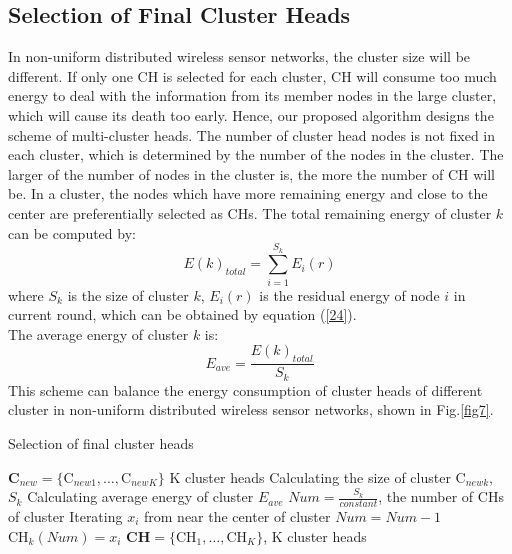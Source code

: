 \documentclass[journal,twoside,web]{ieeecolor}
\begin{document}
\subsection{Selection of Final Cluster Heads}
In non-uniform distributed wireless sensor networks, the cluster size will be different. If only one CH is selected for each cluster, CH will consume too much energy to deal with the information from its member nodes in the large cluster, which will cause its death too early. Hence, our proposed algorithm designs the scheme of multi-cluster heads. The number of cluster head nodes is not fixed in each cluster, which is determined by the number of the nodes in the cluster. The larger of the number of nodes in the cluster is, the more the number of CH will be. In a cluster, the nodes which have more remaining energy and close to the center are preferentially selected as CHs. The total remaining energy of cluster $k$ can be computed by:
\begin{equation}
E\left(k\right)_{total} = \sum_{i=1}^{S_k}E_i\left(r\right)
\end{equation}
where $S_k$ is the size of cluster $k$, $E_i\left(r\right)$ is the residual energy of node $i$ in current round, which can be obtained by equation (\ref{24}).\\
The average energy of cluster $k$ is:
\begin{equation}
E_{ave} = \frac{E\left(k\right)_{total}}{S_k}
\end{equation}
\noindent This scheme can balance the energy consumption of cluster heads of different cluster in non-uniform distributed wireless sensor networks, shown in Fig.\ref{fig7}.

\begin{algorithm}
	\caption{Selection of final cluster heads}
	\label{alg3} 
	\begin{algorithmic}[1]
		\renewcommand{\algorithmicrequire}{\textbf{Input:}}
		\renewcommand{\algorithmicensure}{\textbf{Output:}}
		\REQUIRE $\bm{C}_{new}=\{\text{C}_{new1},\dots,\text{C}_{newK}\}$
		\ENSURE K cluster heads
			\STATE Calculating the size of cluster $\text{C}_{newk}$, $S_k$
			\STATE Calculating average energy of cluster $E_{ave}$
			\STATE $Num = \frac{S_k}{constant}$, the number of CHs of cluster
				\STATE Iterating $x_i$ from near the center of cluster
					\STATE $Num = Num - 1$
					\STATE $\text{CH}_k\left(Num\right) = x_i$
				\ENDIF
			\ENDFOR
		\ENDFOR
		\RETURN $\bm{CH} = \{\text{CH}_1,\dots,\text{CH}_K \}$, K cluster heads 
	\end{algorithmic}
\end{algorithm}
\end{document}
